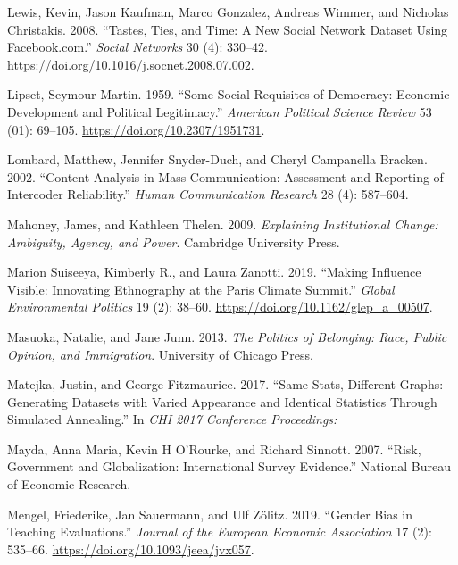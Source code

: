 \documentclass{book}
\newlength{\cslhangindent}
\newlength{\cslentryspacingunit} %
\newenvironment{CSLReferences}[2] %
 {%
  \setlength{\parindent}{0pt}
  \ifodd #1
  \let\oldpar\par
  \def\par{\hangindent=\cslhangindent\oldpar}
  \fi
  \setlength{\parskip}{#2\cslentryspacingunit}
 }%
 {}
\begin{document}
\begin{CSLReferences}{1}{0}
\leavevmode{}%
Lewis, Kevin, Jason Kaufman, Marco Gonzalez, Andreas Wimmer, and Nicholas
Christakis. 2008. {``Tastes, Ties, and Time: A New Social Network Dataset
Using Facebook.com.''} \emph{Social Networks} 30 (4): 330--42.
\url{https://doi.org/10.1016/j.socnet.2008.07.002}.

\leavevmode{}%
Lipset, Seymour Martin. 1959. {``Some {Social Requisites} of {Democracy}:
{Economic Development} and {Political Legitimacy}.''} \emph{American Political
Science Review} 53 (01): 69--105. \url{https://doi.org/10.2307/1951731}.

\leavevmode{}%
Lombard, Matthew, Jennifer Snyder-Duch, and Cheryl Campanella Bracken. 2002.
{``Content Analysis in Mass Communication: Assessment and Reporting of
Intercoder Reliability.''} \emph{Human Communication Research} 28 (4):
587--604.

\leavevmode{}%
Mahoney, James, and Kathleen Thelen. 2009. \emph{Explaining Institutional
Change: Ambiguity, Agency, and Power}. Cambridge University Press.

\leavevmode{}%
Marion Suiseeya, Kimberly R., and Laura Zanotti. 2019. {``Making {Influence
Visible}: {Innovating Ethnography} at the {Paris Climate Summit}.''}
\emph{Global Environmental Politics} 19 (2): 38--60.
\url{https://doi.org/10.1162/glep_a_00507}.

\leavevmode{}%
Masuoka, Natalie, and Jane Junn. 2013. \emph{The Politics of Belonging: Race,
Public Opinion, and Immigration}. University of Chicago Press.

\leavevmode{}%
Matejka, Justin, and George Fitzmaurice. 2017. {``Same {Stats}, {Different
Graphs}: {Generating Datasets} with {Varied Appearance} and {Identical
Statistics} Through {Simulated Annealing}.''} In \emph{{CHI} 2017 {Conference}
Proceedings:}

\leavevmode{}%
Mayda, Anna Maria, Kevin H O'Rourke, and Richard Sinnott. 2007. {``Risk,
Government and Globalization: International Survey Evidence.''} National
Bureau of Economic Research.

\leavevmode{}%
Mengel, Friederike, Jan Sauermann, and Ulf Zölitz. 2019. {``Gender {Bias} in
{Teaching Evaluations}.''} \emph{Journal of the European Economic Association}
17 (2): 535--66. \url{https://doi.org/10.1093/jeea/jvx057}.


\end{CSLReferences}
\end{document}
